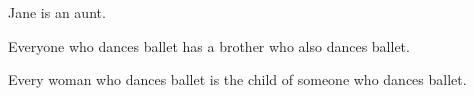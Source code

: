 \begin{practiceproblems}
\begin{earg}
\item Jane is an aunt.
\item[] 
\item Everyone who dances ballet has a brother who also dances ballet.
\item[] 
\item Every woman who dances ballet is the child of someone who dances ballet.
\item[] 
\end{earg}



\end{practiceproblems}


